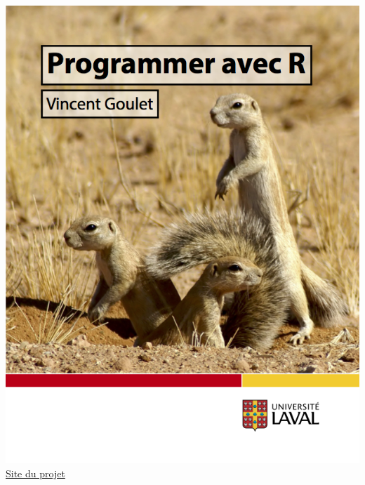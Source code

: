 \begin{frame}
\begin{columns}
\begin{column}{.4\textwidth}
      \includegraphics[width=\linewidth,frame]{programmer-avec-r} \\
      \href{https://vigou3.github.io/programmer-avec-r}{%
        Site du projet}
    \end{column}
  \end{columns}
\end{frame}

